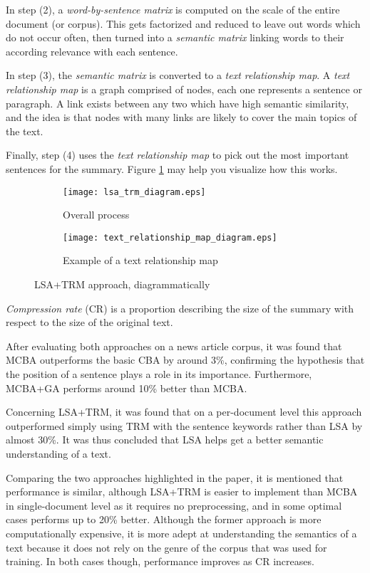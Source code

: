 In step (2), a \textit{word-by-sentence matrix} is computed on the scale of the entire document (or corpus). This  gets factorized and reduced to leave out words which do not occur often, then turned into a \textit{semantic matrix} linking words to their according relevance with each sentence.

In step (3), the \textit{semantic matrix} is converted to a \textit{text relationship map}. A \textit{text relationship map} is a graph comprised of nodes, each one represents a sentence or paragraph. A link exists between any two which have high semantic similarity, and the idea is that nodes with many links are likely to cover the main topics of the text.

Finally, step (4) uses the \textit{text relationship map} to pick out the most important sentences for the summary. Figure \ref{fig:lsa_trm_diagrams} may help you visualize how this works.

\begin{figure}[H]
\begin{subfigure}{0.5\textwidth}
\texttt{[image: lsa\_trm\_diagram.eps]}
\caption{\cite{yeh_text_2005} Overall process}
\end{subfigure}
\begin{subfigure}{0.5\textwidth}
\texttt{[image: text\_relationship\_map\_diagram.eps]}
\caption{\cite{yeh_text_2005} Example of a text relationship map}
\end{subfigure}
\caption{LSA+TRM approach, diagrammatically}
\label{fig:lsa_trm_diagrams}
\end{figure}

\textit{Compression rate} (CR) is a proportion describing the size of the summary with respect to the size of the original text.

After evaluating both approaches on a news article corpus, it was found that MCBA outperforms the basic CBA by around 3\%, confirming the hypothesis that the position of a sentence plays a role in its importance. Furthermore, MCBA+GA performs around 10\% better than MCBA.

Concerning LSA+TRM, it was found that on a per-document level this approach outperformed simply using TRM with the sentence keywords rather than LSA by almost 30\%. It was thus concluded that LSA helps get a better semantic understanding of a text.

Comparing the two approaches highlighted in the paper, it is mentioned that performance is similar, although LSA+TRM is easier to implement than MCBA in single-document level as it requires no preprocessing, and in some optimal cases performs up to 20\% better. Although the former approach is more computationally expensive, it is more adept at understanding the semantics of a text because it does not rely on the genre of the corpus that was used for training. In both cases though, performance improves as CR increases.

